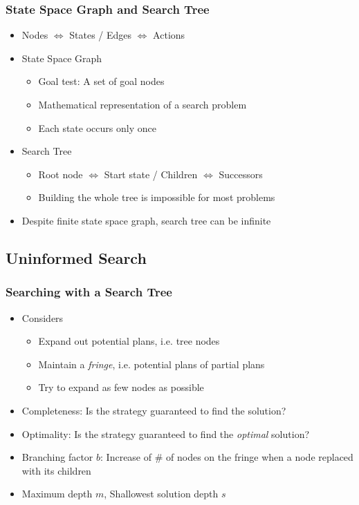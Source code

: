 \subsubsection*{State Space Graph and Search Tree}
\begin{itemize}
    \item Nodes $\iff$ States / Edges $\iff$ Actions
    \item State Space Graph
    \begin{itemize}
        \item Goal test: A set of goal nodes
        \item Mathematical representation of a search problem
        \item Each state occurs only once
    \end{itemize}
    \item Search Tree
    \begin{itemize}
        \item Root node $\iff$ Start state / Children $\iff$ Successors
        \item Building the whole tree is impossible for most problems
    \end{itemize}
    \item Despite finite state space graph, search tree can be infinite
\end{itemize}
\clearpage
\begin{figures}
\end{figures}

\subsection{Uninformed Search}

\subsubsection*{Searching with a Search Tree}
\begin{itemize}
    \item Considers
    \begin{itemize}
        \item Expand out potential plans, i.e. tree nodes
        \item Maintain a \textit{fringe}, i.e. potential plans of partial plans
        \item Try to expand as few nodes as possible
    \end{itemize}
    \item Completeness: Is the strategy guaranteed to find the solution?
    \item Optimality: Is the strategy guaranteed to find the \textit{optimal} solution?
    \item Branching factor $b$: Increase of \# of nodes on the fringe when a node replaced with its children
    \item Maximum depth $m$, Shallowest solution depth $s$
\end{itemize}


